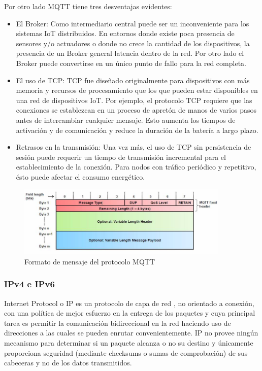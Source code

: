 Por otro lado MQTT tiene tres desventajas evidentes:
\begin{itemize}
\item El Broker: Como intermediario central puede ser un inconveniente para los sistemas IoT distribuidos. En entornos donde existe poca presencia de sensores y/o actuadores o donde no crece la cantidad de los dispositivos, la presencia de un Broker general latencia dentro de la red. Por otro lado el Broker puede convertirse en un único punto de fallo para la red completa.
\item El uso de TCP: TCP fue diseñado originalmente para dispositivos con más memoria y recursos de procesamiento que los que pueden estar disponibles en una red de dispositivos IoT. Por ejemplo, el protocolo TCP requiere que las conexiones se establezcan en un proceso de apretón de manos de varios pasos antes de intercambiar cualquier mensaje. Esto aumenta los tiempos de activación y de comunicación y reduce la duración de la batería a largo plazo.
\item Retrasos en la transmisión: Una vez más, el uso de TCP sin persistencia de sesión puede requerir un tiempo de transmisión incremental para el establecimiento de la conexión. Para nodos con tráfico periódico y repetitivo, ésto puede afectar el consumo energético.
\end{itemize}

\begin{figure}[ht]
\centering
\includegraphics[width=0.9\textwidth]{./Figuras/mqtt_header.jpg}
\caption{\label{fig:mqttheader}Formato de mensaje del protocolo MQTT}
\vspace*{-10pt}
\end{figure}


\subsubsection{IPv4 e IPv6}
Internet Protocol o IP es un protocolo de capa de red , no orientado a conexión, con una política de mejor esfuerzo en la entrega de los paquetes y cuya principal tarea es permitir la comunicación bidireccional en la red haciendo uso de direcciones a las cuales se pueden enrutar convenientemente. IP no provee ningún mecanismo para determinar si un paquete alcanza o no su destino y únicamente proporciona seguridad (mediante checksums o sumas de comprobación) de sus cabeceras y no de los datos transmitidos. \\

